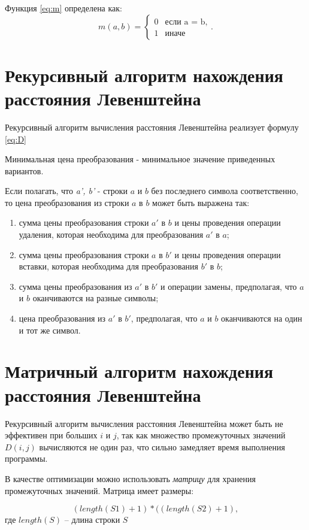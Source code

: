 Функция \ref{eq:m} определена как:
\begin{equation}
	\label{eq:m}
	m(a, b) = \begin{cases}
		0 &\text{если a = b,}\\
		1 &\text{иначе}
	\end{cases}.
\end{equation}


\section{Рекурсивный алгоритм нахождения расстояния Левенштейна}
Рекурсивный алгоритм вычисления расстояния Левенштейна реализует формулу \ref{eq:D}

Минимальная цена преобразования - минимальное значение приведенных вариантов.

Если полагать, что \textit{a', b'} - строки $a$ и $b$ без последнего символа соответственно, то цена преобразования из строки $a$ в $b$ может быть выражена так:

\begin{enumerate}
	\item сумма цены преобразования строки $a'$ в $b$ и цены проведения операции удаления, которая необходима для преобразования $a'$ в $a$;
	\item сумма цены преобразования строки $a$ в $b'$  и цены проведения операции вставки, которая необходима для преобразования $b'$ в $b$;
	\item сумма цены преобразования из $a'$ в $b'$ и операции замены, предполагая, что $a$ и $b$ оканчиваются на разные символы;
	\item цена преобразования из $a'$ в $b'$, предполагая, что $a$ и $b$ оканчиваются на один и тот же символ.
\end{enumerate}


\section{Матричный алгоритм нахождения расстояния Левенштейна}

Рекурсивный алгоритм вычисления расстояния Левенштейна может быть не эффективен при больших $i$ и $j$, так как множество промежуточных значений $D(i, j)$ вычисляются не один раз, что сильно замедляет время выполнения программы.

В качестве оптимизации можно использовать \textit{матрицу} для хранения промежуточных значений. Матрица имеет размеры:

\begin{equation}
	(length(S1)+ 1)*((length(S2) + 1),
\end{equation}
где $length(S)$ -- длина строки $S$

